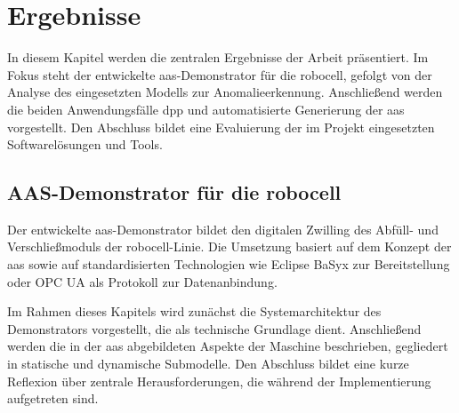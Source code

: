 \newpage
\section{Ergebnisse}
In diesem Kapitel werden die zentralen Ergebnisse der Arbeit präsentiert. 
Im Fokus steht der entwickelte \acs{aas}-Demonstrator für die robocell, gefolgt von der Analyse des eingesetzten Modells zur Anomalieerkennung.
Anschließend werden die beiden Anwendungsfälle \acs{dpp} und automatisierte Generierung der \acs{aas} vorgestellt. 
Den Abschluss bildet eine Evaluierung der im Projekt eingesetzten Softwarelösungen und Tools.

\subsection{AAS-Demonstrator für die robocell}

Der entwickelte \acs{aas}-Demonstrator bildet den digitalen Zwilling des Abfüll- und Verschließmoduls der robocell-Linie.  
Die Umsetzung basiert auf dem Konzept der \acs{aas} sowie auf standardisierten Technologien wie Eclipse BaSyx zur Bereitstellung oder OPC UA als Protokoll zur Datenanbindung. 

Im Rahmen dieses Kapitels wird zunächst die Systemarchitektur des Demonstrators vorgestellt, die als technische Grundlage dient.  
Anschließend werden die in der \acs{aas} abgebildeten Aspekte der Maschine beschrieben, gegliedert in statische und dynamische Submodelle.  
Den Abschluss bildet eine kurze Reflexion über zentrale Herausforderungen, die während der Implementierung aufgetreten sind.





